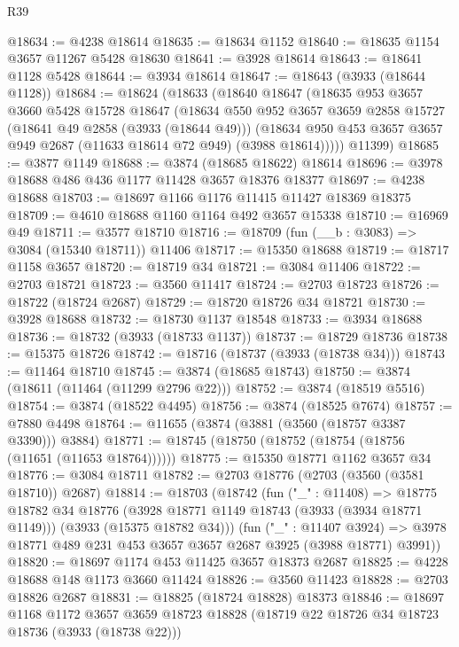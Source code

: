 \begin{lexlean}{R39}
\begin{coremodule}
@18634 := @4238 @18614
@18635 := @18634 @1152
@18640 := @18635 @1154 @3657 @11267 @5428 @18630
@18641 := @3928 @18614
@18643 := @18641 @1128 @5428
@18644 := @3934 @18614
@18647 := @18643 (@3933 (@18644 @1128))
@18684 := @18624
    (@18633
      (@18640
        @18647
        (@18635
          @953
          @3657
          @3660
          @5428
          @15728
          @18647
          (@18634
            @550
            @952
            @3657
            @3659
            @2858
            @15727
            (@18641 @49 @2858 (@3933 (@18644 @49)))
            (@18634 @950 @453 @3657 @3657 @949 @2687 (@11633 @18614 @72 @949) (@3988 @18614)))))
      @11399)
@18685 := @3877 @1149
@18688 := @3874 (@18685 @18622) @18614
@18696 := @3978 @18688 @486 @436 @1177 @11428 @3657 @18376 @18377
@18697 := @4238 @18688
@18703 := @18697 @1166 @1176 @11415 @11427 @18369 @18375
@18709 := @4610 @18688 @1160 @1164 @492 @3657 @15338
@18710 := @16969 @49
@18711 := @3577 @18710
@18716 := @18709 (fun (__b : @3083) => @3084 (@15340 @18711)) @11406
@18717 := @15350 @18688
@18719 := @18717 @1158 @3657
@18720 := @18719 @34
@18721 := @3084 @11406
@18722 := @2703 @18721
@18723 := @3560 @11417
@18724 := @2703 @18723
@18726 := @18722 (@18724 @2687)
@18729 := @18720 @18726 @34 @18721
@18730 := @3928 @18688
@18732 := @18730 @1137 @18548
@18733 := @3934 @18688
@18736 := @18732 (@3933 (@18733 @1137))
@18737 := @18729 @18736
@18738 := @15375 @18726
@18742 := @18716 (@18737 (@3933 (@18738 @34)))
@18743 := @11464 @18710
@18745 := @3874 (@18685 @18743)
@18750 := @3874 (@18611 (@11464 (@11299 @2796 @22)))
@18752 := @3874 (@18519 @5516)
@18754 := @3874 (@18522 @4495)
@18756 := @3874 (@18525 @7674)
@18757 := @7880 @4498
@18764 := @11655 (@3874 (@3881 (@3560 (@18757 @3387 @3390))) @3884)
@18771 := @18745 (@18750 (@18752 (@18754 (@18756 (@11651 (@11653 @18764))))))
@18775 := @15350 @18771 @1162 @3657 @34
@18776 := @3084 @18711
@18782 := @2703 @18776 (@2703 (@3560 (@3581 @18710)) @2687)
@18814 := @18703
    (@18742
      (fun ("_" : @11408) =>
      @18775
        @18782
        @34
        @18776
        (@3928 @18771 @1149 @18743 (@3933 (@3934 @18771 @1149)))
        (@3933 (@15375 @18782 @34)))
      (fun ("_" : @11407 @3924) =>
      @3978 @18771 @489 @231 @453 @3657 @3657 @2687 @3925 (@3988 @18771) @3991))
@18820 := @18697 @1174 @453 @11425 @3657 @18373 @2687
@18825 := @4228 @18688 @148 @1173 @3660 @11424
@18826 := @3560 @11423
@18828 := @2703 @18826 @2687
@18831 := @18825 (@18724 @18828) @18373
@18846 := @18697
    @1168
    @1172
    @3657
    @3659
    @18723
    @18828
    (@18719 @22 @18726 @34 @18723 @18736 (@3933 (@18738 @22)))

\end{coremodule}
\end{lexlean}
